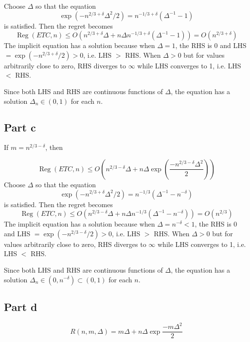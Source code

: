 \documentclass{article}
\theoremstyle{mytheoremstyle}
\theoremstyle{mytheoremstyle}
\theoremstyle{myproblemstyle}
\DeclareMathOperator{\Reg}{Reg}
\begin{document}
Choose $\Delta$ so that the equation
\[
  \exp{(-n^{2/3 + \delta}\Delta^2/2)} = n^{-1/3 + \delta}(\Delta^{-1}-1)
\]
is satisfied.
Then the regret becomes 
\[
  \Reg(ETC, n) \leq O(n^{2/3+\delta}\Delta + n\Delta n^{-1/3 + \delta}(\Delta^{-1}-1)) = O(n^{2/3+\delta})
\]
The implicit equation has a solution because when $\Delta = 1$, the RHS is 0 and 
LHS $= \exp{(-n^{2/3 + \delta}/2)} > 0$, i.e. LHS $>$ RHS.
When $\Delta > 0$ but for values arbitrarily close to zero, RHS diverges to $\infty$ while LHS converges to 1, i.e. LHS $<$ RHS.

Since both LHS and RHS are continuous functions of $\Delta$, the equation has a solution $\Delta_n \in (0,1)$ for each $n$.

\subsection*{Part c}
If $m = n^{2/3 - \delta}$, then 

\[
  \Reg(ETC, n) \leq O(n^{2/3-\delta}\Delta + n\Delta\exp{(\frac{-n^{2/3 - \delta}\Delta^2}{2})})
\]
Choose $\Delta$ so that the equation
\[
  \exp{(-n^{2/3 + \delta}\Delta^2/2)} = n^{-1/3}(\Delta^{-1}-n^{-\delta})
\]
is satisfied.
Then the regret becomes 
\[
  \Reg(ETC, n) \leq O(n^{2/3-\delta}\Delta + n\Delta n^{-1/3}(\Delta^{-1}-n^{-\delta})) = O(n^{2/3})
\]
The implicit equation has a solution because when $\Delta = n^{-\delta} < 1$, the RHS is 0 and 
LHS $= \exp{(-n^{2/3 - \delta}/2)} > 0$, i.e. LHS $>$ RHS.
When $\Delta > 0$ but for values arbitrarily close to zero, RHS diverges to $\infty$ while LHS converges to 1, i.e. LHS $<$ RHS.

Since both LHS and RHS are continuous functions of $\Delta$, the equation has a solution $\Delta_n \in (0,n^{-\delta}) \subset (0, 1)$ for each $n$.

\subsection*{Part d}

\[
  R(n,m, \Delta) = m\Delta + n\Delta\exp{\frac{-m\Delta^2}{2}}
\]
\end{document}
